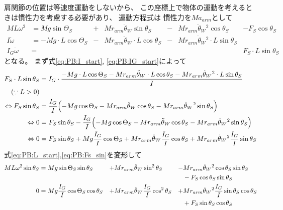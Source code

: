 \documentclass[a4paper,11pt]{jsarticle}
\begin{document}
肩関節の位置は等速度運動をしないから、
この座標上で物体の運動を考えるときは慣性力を考慮する必要があり、
運動方程式は
慣性力を$Ma_{arm}$として
\begin{align}
  ML\omega^2 
  &= Mg\sin\Theta_S 
  &+& Mr_{arm}\ddot{\theta}_W\sin\theta_S 
  &-& Mr_{arm}\dot{\theta}_W{}^2\cos\theta_S 
  &- F_S\cos\theta_S
  \label{eq:PB:L_start}
  \\
  I\dot\omega 
  &= -Mg \cdot L\cos\Theta_S
  &-& Mr_{arm}\ddot{\theta}_W \cdot L \cos\theta_S
  &-& Mr_{arm}\dot{\theta}_W{}^2 \cdot L \sin\theta_S
  &
  \label{eq:PB:I_start}
  \\
  I_G\dot\omega &= & & & & & F_S \cdot L \sin\theta_S
  \label{eq:PB:IG_start}
\end{align}
となる。
まず式\ref{eq:PB:I_start}, \ref{eq:PB:IG_start}によって
\begin{align}
  F_S \cdot L \sin\theta_S
  & = I_G \cdot 
  \frac{
    -Mg \cdot L\cos\Theta_S
    - Mr_{arm}\ddot{\theta}_W \cdot L \cos\theta_S
    - Mr_{arm}\dot{\theta}_W{}^2 \cdot L \sin\theta_S
  }{I}
  \\
  \left( \because L > 0 \right) &
  \\
  \Leftrightarrow
  F_S\sin\theta_S
  & = \frac{I_G}{I}
  \Bigl(
    -Mg \cos\Theta_S
    - Mr_{arm}\ddot{\theta}_W \cos\theta_S
    - Mr_{arm}\dot{\theta}_W{}^2 \sin\theta_S
  \Bigr)
  \\
  \Leftrightarrow
  0
  & = F_S\sin\theta_S - \frac{I_G}{I}
  \Bigl(
    -Mg \cos\Theta_S
    - Mr_{arm}\ddot{\theta}_W \cos\theta_S
    - Mr_{arm}\dot{\theta}_W{}^2 \sin\theta_S
  \Bigr)
  \\
  \Leftrightarrow
  0
  & = F_S\sin\theta_S
  +Mg \frac{I_G}{I}\cos\Theta_S
  +Mr_{arm}\ddot{\theta}_W \frac{I_G}{I}\cos\theta_S
  +Mr_{arm}\dot{\theta}_W{}^2 \frac{I_G}{I}\sin\theta_S
  \label{eq:PB:Fs_sin}
\end{align}
式\ref{eq:PB:L_start},\ref{eq:PB:Fs_sin}を変形して
\begin{align}
  ML\omega^2 \sin\theta_S 
  &= Mg\sin\Theta_S \sin\theta_S
  &+& Mr_{arm}\ddot{\theta}_W\sin^2\theta_S
  &-& Mr_{arm}\dot{\theta}_W{}^2\cos\theta_S \sin\theta_S
  \notag
  \\
  &&&&&- F_S\cos\theta_S\sin\theta_S
  \\
  0
  &=  Mg\frac{I_G}{I}\cos\Theta_S\cos\theta_S
  &+& Mr_{arm}\ddot{\theta}_W \frac{I_G}{I}\cos^2\theta_S
  &+& Mr_{arm}\dot{\theta}_W{}^2 \frac{I_G}{I}\sin\theta_S\cos\theta_S
  \notag
  \\
  &&&&&+ F_S\sin\theta_S\cos\theta_S
\end{align}
\end{document}
